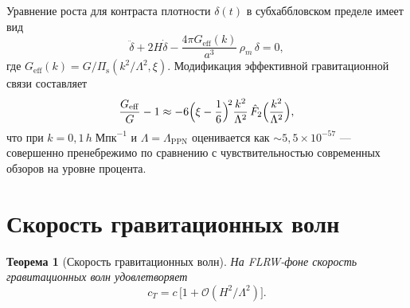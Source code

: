 \documentclass[12pt,a4paper]{article}
\newcommand{\Pis}{\Pi_{\mathrm{s}}}
\newcommand{\order}{\mathcal{O}}
\newcommand{\Lam}{\Lambda}
\theoremstyle{plain}
\newtheorem{theorem}{Теорема}[section]
\theoremstyle{definition}
\begin{document}
Уравнение роста для контраста плотности $\delta(t)$ в субхаббловском
пределе имеет вид
\begin{equation}\label{eq:growth-eq}
  \ddot{\delta} + 2H\dot{\delta}
  - \frac{4\pi G_{\mathrm{eff}}(k)}{a^3}\,\rho_m\,\delta = 0,
\end{equation}
где $G_{\mathrm{eff}}(k) = G/\Pis(k^2/\Lam^2,\xi)$.  Модификация
эффективной гравитационной связи составляет
\begin{equation}\label{eq:Geff-deviation}
  \frac{G_{\mathrm{eff}}}{G} - 1
  \approx -6\Bigl(\xi - \frac{1}{6}\Bigr)^{\!2}
  \frac{k^2}{\Lam^2}\,\hat{F}_2\Bigl(\frac{k^2}{\Lam^2}\Bigr),
\end{equation}
что при $k = 0{,}1\,h\;\text{Мпк}^{-1}$ и $\Lam = \Lam_{\mathrm{PPN}}$
оценивается как $\sim 5{,}5 \times 10^{-57}$ --- совершенно пренебрежимо
по сравнению с чувствительностью современных обзоров на уровне процента.

\section{Скорость гравитационных волн}
\label{sec:gw-speed}

\begin{theorem}[Скорость гравитационных волн]
\label{thm:gw-speed}
На FLRW-фоне скорость гравитационных волн удовлетворяет
\begin{equation}\label{eq:cT}
  c_T = c\,\bigl[1 + \order(H^2/\Lam^2)\bigr].
\end{equation}
\end{theorem}
\end{document}
